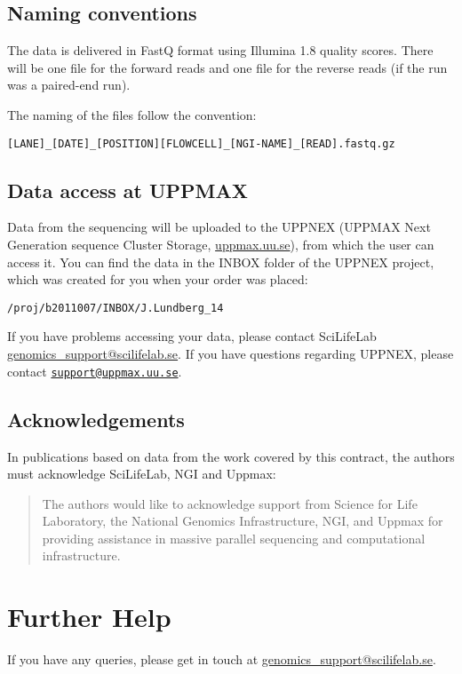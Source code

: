 \documentclass[12pt]{article}
\begin{document}
\subsection{Naming conventions}\label{naming-conventions}

The data is delivered in FastQ format using Illumina 1.8 quality scores.
There will be one file for the forward reads and one file for the
reverse reads (if the run was a paired-end run).

The naming of the files follow the convention:

\begin{verbatim}
[LANE]_[DATE]_[POSITION][FLOWCELL]_[NGI-NAME]_[READ].fastq.gz
\end{verbatim}

\subsection{Data access at UPPMAX}\label{data-access-at-uppmax}

Data from the sequencing will be uploaded to the UPPNEX (UPPMAX Next
Generation sequence Cluster Storage,
\href{http://www.uppmax.uu.se}{uppmax.uu.se}), from which the user can
access it. You can find the data in the INBOX folder of the UPPNEX
project, which was created for you when your order was placed:

\begin{verbatim}
/proj/b2011007/INBOX/J.Lundberg_14
\end{verbatim}

If you have problems accessing your data, please contact SciLifeLab
\href{mailto:\%20genomics_support@scilifelab.se}{genomics\_support@scilifelab.se}.
If you have questions regarding UPPNEX, please contact
\href{mailto:support@uppmax.uu.se}{\nolinkurl{support@uppmax.uu.se}}.

\subsection{Acknowledgements}\label{acknowledgements}

In publications based on data from the work covered by this contract,
the authors must acknowledge SciLifeLab, NGI and Uppmax:

\begin{quote}
The authors would like to acknowledge support from Science for Life
Laboratory, the National Genomics Infrastructure, NGI, and Uppmax for
providing assistance in massive parallel sequencing and computational
infrastructure.
\end{quote}

\section{Further Help}\label{further-help}

If you have any queries, please get in touch at
\href{mailto:\%20genomics_support@scilifelab.se}{genomics\_support@scilifelab.se}.
\end{document}
